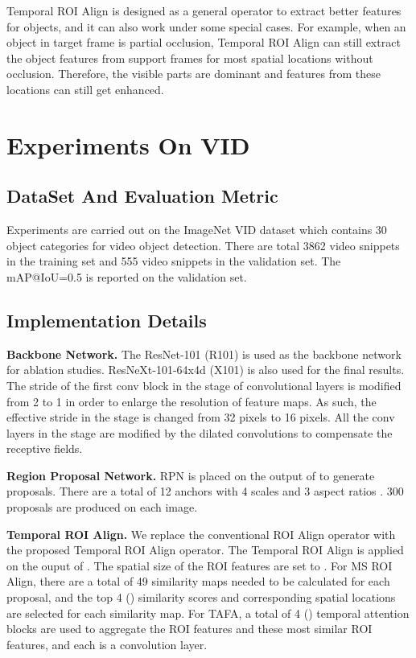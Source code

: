 \documentclass[letterpaper]{article} \usepackage{aaai21}  \usepackage{times}  \usepackage{helvet} \usepackage{courier}  \usepackage[hyphens]{url}  \usepackage{graphicx} \usepackage{hyperref}
\begin{document}
Temporal ROI Align is designed as a general operator to extract better features for objects, and it can also work under some special cases. For example, when an object in target frame is partial occlusion, Temporal ROI Align can still extract the object features from support frames for most spatial locations without occlusion. Therefore, the visible parts are dominant and features from these locations can still get enhanced. \section{Experiments On VID}


\subsection{DataSet And Evaluation Metric}
\label{exp_dataset}

Experiments are carried out on the ImageNet VID dataset \cite{russakovsky2015imagenet} which contains 30 object categories for video object detection.
There are total 3862 video snippets in the training set and 555 video snippets in the validation set. 
The mAP@IoU=0.5 is reported on the validation set.

\subsection{Implementation Details}
\label{exp_implement_details}

\noindent\textbf{Backbone Network.}
The ResNet-101 \cite{he2016deep} (R101) is used as the backbone network  for ablation studies. ResNeXt-101-64x4d \cite{xie2017aggregated} (X101) is also used for the final results. The stride of the first conv block in the  stage of convolutional layers is modified from 2 to 1 in order to enlarge the resolution of feature maps. As such, the effective stride in the stage is changed from 32 pixels to 16 pixels. All the  conv layers in the stage are modified by the dilated convolutions to compensate the receptive fields.

\noindent\textbf{Region Proposal Network.}
RPN is placed on the output of  to generate proposals. There are a total of 12 anchors with 4 scales  and 3 aspect ratios . 300 proposals are produced on each image.

\noindent\textbf{Temporal ROI Align.}
We replace the conventional ROI Align operator with the proposed Temporal ROI Align operator. The Temporal ROI Align is applied on the ouput of . The spatial size  of the ROI features are set to . For MS ROI Align, there are a total of 49 similarity maps needed to be calculated for each proposal, and the top 4 () similarity scores and corresponding spatial locations are selected for each similarity map. For TAFA, a total of 4 () temporal attention blocks are used to aggregate the ROI features and these most similar ROI features, and each  is a  convolution layer.
\end{document}
